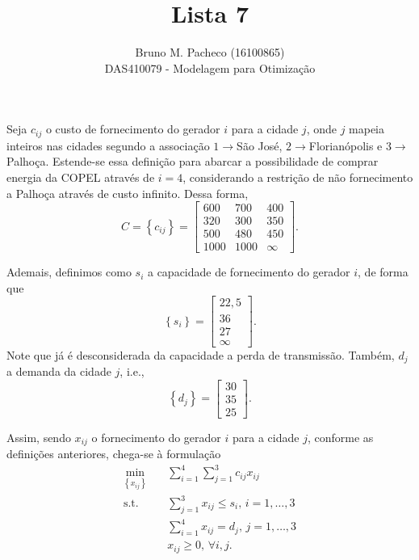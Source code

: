 \documentclass[a4paper]{report}
\begin{document}
 
\title{Lista 7}
\author{Bruno M. Pacheco (16100865)\\
DAS410079 - Modelagem para Otimização}
 
\maketitle
 

Seja $c_{ij}$ o custo de fornecimento do gerador $i$ para a cidade $j$, onde $j$ mapeia inteiros nas cidades segundo a associação $1\to $São José, $2\to $Florianópolis e $3\to $Palhoça.
Estende-se essa definição para abarcar a possibilidade de comprar energia da COPEL através de $i=4$, considerando a restrição de não fornecimento a Palhoça através de custo infinito.
Dessa forma, \[
C = \left\{ c_{ij} \right\} = \begin{bmatrix} 
    600 & 700 & 400 \\
    320 & 300 & 350 \\
    500 & 480 & 450 \\
    1000 & 1000 & \infty
\end{bmatrix} 
.\] 

Ademais, definimos como $s_i$ a capacidade de fornecimento do gerador $i$, de forma que \[
\left\{ s_i \right\} = \begin{bmatrix} 22,5 \\ 36 \\ 27 \\ \infty \end{bmatrix} 
.\] Note que já é desconsiderada da capacidade a perda de transmissão. Também, $d_j$ a demanda da cidade $j$, i.e., \[
\left\{ d_j \right\}  = \begin{bmatrix} 30 \\ 35 \\ 25 \end{bmatrix} 
.\] 

Assim, sendo $x_{ij}$ o fornecimento do gerador $i$ para a cidade $j$, conforme as definições anteriores, chega-se à formulação
\begin{align*}
    \min_{\left\{ x_{ij} \right\}} \quad & \sum_{i=1}^{4} \sum_{j=1}^{3} c_{ij}x_{ij} \\
    \textrm{s.t.} \quad & \sum_{j=1}^{3} x_{ij} \le  s_i,\, i=1,\ldots,3 \\
      & \sum_{i=1}^{4} x_{ij} = d_j,\, j=1,\ldots,3 \\
      & x_{ij} \ge 0,\, \forall i,j
.\end{align*}
\end{document}
